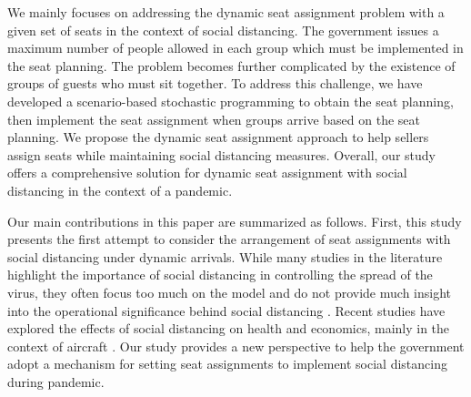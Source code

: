 




We mainly focuses on addressing the dynamic seat assignment problem with a given set of seats in the context of social distancing. The government issues a maximum number of people allowed in each group which must be implemented in the seat planning. The problem becomes further complicated by the existence of groups of guests who must sit together. To address this challenge, we have developed a scenario-based stochastic programming to obtain the seat planning, then implement the seat assignment when groups arrive based on the seat planning. We propose the dynamic seat assignment approach to help sellers assign seats while maintaining social distancing measures. Overall, our study offers a comprehensive solution for dynamic seat assignment with social distancing in the context of a pandemic.


Our main contributions in this paper are summarized as follows. First, this study presents the first attempt to consider the arrangement of seat assignments with social distancing under dynamic arrivals. While many studies in the literature highlight the importance of social distancing in controlling the spread of the virus, they often focus too much on the model and do not provide much insight into the operational significance behind social distancing \cite{barry2021optimal, fischetti2021safe}. Recent studies have explored the effects of social distancing on health and economics, mainly in the context of aircraft \cite{salari2020social, ghorbani2020model, salari2022social}. Our study provides a new perspective to help the government adopt a mechanism for setting seat assignments to implement social distancing during pandemic.

